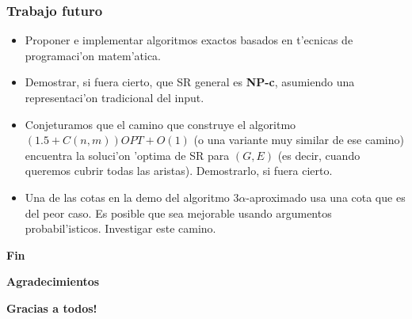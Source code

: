 \documentclass{beamer}
\newcommand{\class}[1]{\textnormal{\textbf{#1}}}
\newcommand{\probl}[1]{\textnormal{\textsf{#1}}}
\begin{document}
\begin{frame}
\frametitle{Trabajo futuro}

\pause

\begin{itemize}
	\item Proponer e implementar algoritmos exactos basados en t'ecnicas de programaci'on matem'atica.
	\pause
	\item Demostrar, si fuera cierto, que \probl{SR} general es \class{NP-c}, asumiendo una representaci'on tradicional del input.
	\pause
	\item Conjeturamos que el camino que construye el algoritmo $(1.5 + C(n, m))OPT + O(1)$ (o una variante muy similar de ese camino) encuentra la soluci'on 'optima de \probl{SR} para $(G, E)$ (es decir, cuando queremos cubrir todas las aristas). Demostrarlo, si fuera cierto.
	\pause
	\item Una de las cotas en la demo del algoritmo $3\alpha$-aproximado usa una cota que es del peor caso. Es posible que sea mejorable usando argumentos probabil'isticos. Investigar este camino.
\end{itemize}

\end{frame}

\begin{frame}
\begin{center}
\begin{huge}
\textbf{Fin}
\end{huge}
\end{center}
\end{frame}

\begin{frame}
\begin{center}
\begin{huge}
\textbf{Agradecimientos}
\end{huge}
\end{center}
\end{frame}

\begin{frame}
\begin{center}
\begin{huge}
\textbf{Gracias a todos!}
\end{huge}
\end{center}
\end{frame}
\end{document}

